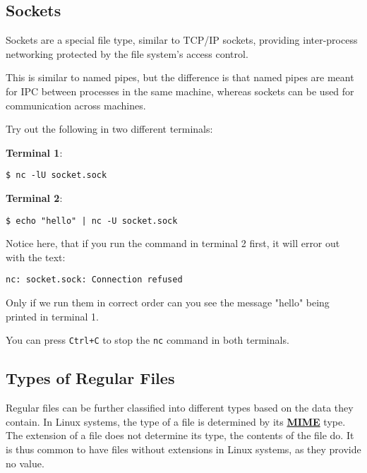 \subsection{Sockets}

Sockets are a special file type, similar to TCP/IP sockets, providing inter-process networking protected by the file system's access control.

This is similar to named pipes, but the difference is that named pipes are meant for IPC between processes in the same machine, whereas sockets can be used for communication across machines.

Try out the following in two different terminals:

\textbf{Terminal 1}:
\begin{lstlisting}
$ nc -lU socket.sock
\end{lstlisting}

\textbf{Terminal 2}:
\begin{lstlisting}
$ echo "hello" | nc -U socket.sock
\end{lstlisting}

Notice here, that if you run the command in terminal 2 first, it will error out with the text:
\begin{lstlisting}
nc: socket.sock: Connection refused
\end{lstlisting}

Only if we run them in correct order can you see the message "hello" being printed in terminal 1.

You can press \lstinline|Ctrl+C| to stop the \lstinline|nc| command in both terminals.

\subsection{Types of Regular Files}

Regular files can be further classified into different types based on the data they contain.
In Linux systems, the type of a file is determined by its \textbf{
  \href{https://developer.mozilla.org/en-US/docs/Web/HTTP/Basics_of_HTTP/MIME_types}{MIME}
} type.
The extension of a file does not determine its type, the contents of the file do.
It is thus common to have files without extensions in Linux systems, as they provide no value.

